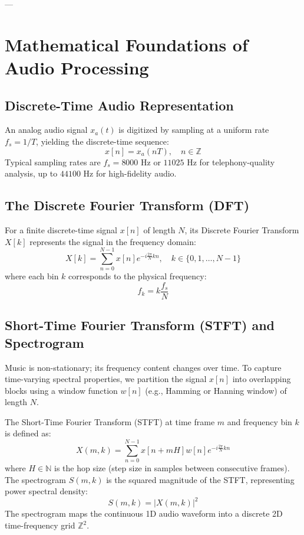 \documentclass[11pt,journal,onecolumn]{IEEEtran}
\begin{document}
---

\section{Mathematical Foundations of Audio Processing}

\subsection{Discrete-Time Audio Representation}
An analog audio signal $x_a(t)$ is digitized by sampling at a uniform rate $f_s = 1/T$, yielding the discrete-time sequence:
\begin{equation}
x[n] = x_a(nT), \quad n \in \mathbb{Z}
\end{equation}
Typical sampling rates are $f_s = 8000\text{ Hz}$ or $11025\text{ Hz}$ for telephony-quality analysis, up to $44100\text{ Hz}$ for high-fidelity audio.

\subsection{The Discrete Fourier Transform (DFT)}
For a finite discrete-time signal $x[n]$ of length $N$, its Discrete Fourier Transform $X[k]$ represents the signal in the frequency domain:
\begin{equation}
X[k] = \sum_{n=0}^{N-1} x[n] e^{-i \frac{2\pi}{N} k n}, \quad k \in \{0, 1, \dots, N-1\}
\end{equation}
where each bin $k$ corresponds to the physical frequency:
\begin{equation}
f_k = k \frac{f_s}{N}
\end{equation}

\subsection{Short-Time Fourier Transform (STFT) and Spectrogram}
Music is non-stationary; its frequency content changes over time. To capture time-varying spectral properties, we partition the signal $x[n]$ into overlapping blocks using a window function $w[n]$ (e.g., Hamming or Hanning window) of length $N$.

The Short-Time Fourier Transform (STFT) at time frame $m$ and frequency bin $k$ is defined as:
\begin{equation}
X(m, k) = \sum_{n=0}^{N-1} x[n + m H] w[n] e^{-i \frac{2\pi}{N} k n}
\end{equation}
where $H \in \mathbb{N}$ is the hop size (step size in samples between consecutive frames). The spectrogram $S(m, k)$ is the squared magnitude of the STFT, representing power spectral density:
\begin{equation}
S(m, k) = |X(m, k)|^2
\end{equation}
The spectrogram maps the continuous 1D audio waveform into a discrete 2D time-frequency grid $\mathbb{Z}^2$.
\end{document}
